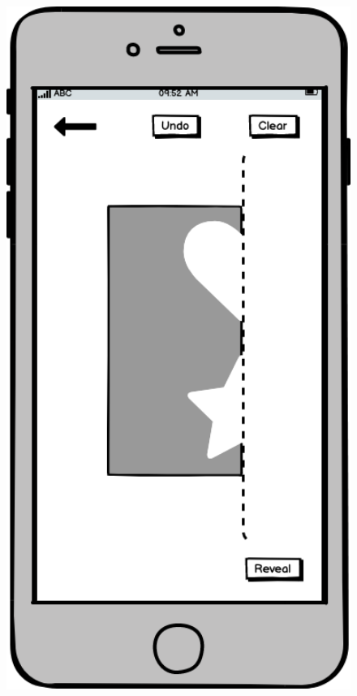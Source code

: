 \documentclass[11pt]{article}
\begin{document}
            \begin{figure}
                \begin{minipage}[c]{0.35\textwidth}
                \includegraphics[width=1\textwidth]{Images/Prototype/prototypeCreatePattern}
                \end{minipage}\hfill

\end{figure}
\end{document}
